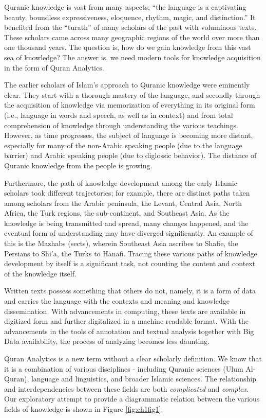 \documentclass[
]{article}
\begin{document}
Quranic knowledge is vast from many aspects; ``the language is a captivating beauty, boundless expressiveness, eloquence, rhythm, magic, and distinction.''\citep{saeh2015} It benefited from the ``turath'' of many scholars of the past with voluminous texts. These scholars came across many geographic regions of the world over more than one thousand years. The question is, how do we gain knowledge from this vast sea of knowledge? The answer is, we need modern tools for knowledge acquisition in the form of Quran Analytics.

The earlier scholars of Islam's approach to Quranic knowledge were eminently clear. They start with a thorough mastery of the language, and secondly through the acquisition of knowledge via memorization of everything in its original form (i.e., language in words and speech, as well as in context) and from total comprehension of knowledge through understanding the various teachings. However, as time progresses, the subject of language is becoming more distant, especially for many of the non-Arabic speaking people (due to the language barrier) and Arabic speaking people (due to diglossic behavior). The distance of Quranic knowledge from the people is growing.

Furthermore, the path of knowledge development among the early Islamic scholars took different trajectories; for example, there are distinct paths taken among scholars from the Arabic peninsula, the Levant, Central Asia, North Africa, the Turk regions, the sub-continent, and Southeast Asia. As the knowledge is being transmitted and spread, many changes happened, and the eventual form of understanding may have diverged significantly. An example of this is the Mazhabs (sects), wherein Southeast Asia ascribes to Shafie, the Persians to Shi'a, the Turks to Hanafi. Tracing these various paths of knowledge development by itself is a significant task, not counting the content and context of the knowledge itself.

Written texts possess something that others do not, namely, it is a form of data and carries the language with the contexts and meaning and knowledge dissemination. With advancements in computing, these texts are available in digitized form and further digitalized in a machine-readable format. With the advancements in the tools of annotation and textual analysis together with Big Data availability, the process of analyzing becomes less daunting.

Quran Analytics is a new term without a clear scholarly definition. We know that it is a combination of various disciplines - including Quranic sciences (Ulum Al-Quran), language and linguistics, and broader Islamic sciences. The relationship and interdependencies between these fields are both \emph{complicated} and \emph{complex}. Our exploratory attempt to provide a diagrammatic relation between the various fields of knowledge is shown in Figure \ref{fig:ch1fig1}.
\end{document}
